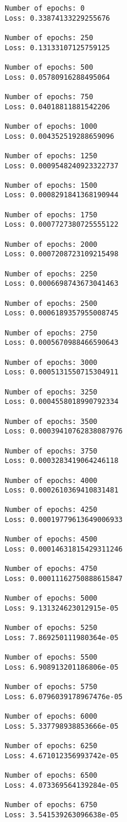 \documentclass[11pt]{article}
\begin{document}
    \begin{Verbatim}[commandchars=\\\{\}]
Number of epochs: 0
Loss: 0.33874133229255676

Number of epochs: 250
Loss: 0.13133107125759125

Number of epochs: 500
Loss: 0.05780916288495064

Number of epochs: 750
Loss: 0.04018811881542206

Number of epochs: 1000
Loss: 0.004352519288659096

Number of epochs: 1250
Loss: 0.0009548240923322737

Number of epochs: 1500
Loss: 0.0008291841368190944

Number of epochs: 1750
Loss: 0.0007727380725555122

Number of epochs: 2000
Loss: 0.0007208723109215498

Number of epochs: 2250
Loss: 0.0006698743673041463

Number of epochs: 2500
Loss: 0.0006189357955008745

Number of epochs: 2750
Loss: 0.0005670988466590643

Number of epochs: 3000
Loss: 0.0005131550715304911

Number of epochs: 3250
Loss: 0.0004558018990792334

Number of epochs: 3500
Loss: 0.00039410762838087976

Number of epochs: 3750
Loss: 0.0003283419064246118

Number of epochs: 4000
Loss: 0.0002610369410831481

Number of epochs: 4250
Loss: 0.00019779613649006933

Number of epochs: 4500
Loss: 0.00014631815429311246

Number of epochs: 4750
Loss: 0.00011162750888615847

Number of epochs: 5000
Loss: 9.131324623012915e-05

Number of epochs: 5250
Loss: 7.869250111980364e-05

Number of epochs: 5500
Loss: 6.908913201186806e-05

Number of epochs: 5750
Loss: 6.0796039178967476e-05

Number of epochs: 6000
Loss: 5.337798938853666e-05

Number of epochs: 6250
Loss: 4.671012356993742e-05

Number of epochs: 6500
Loss: 4.073369564139284e-05

Number of epochs: 6750
Loss: 3.541539263096638e-05


\end{Verbatim}
\end{document}

